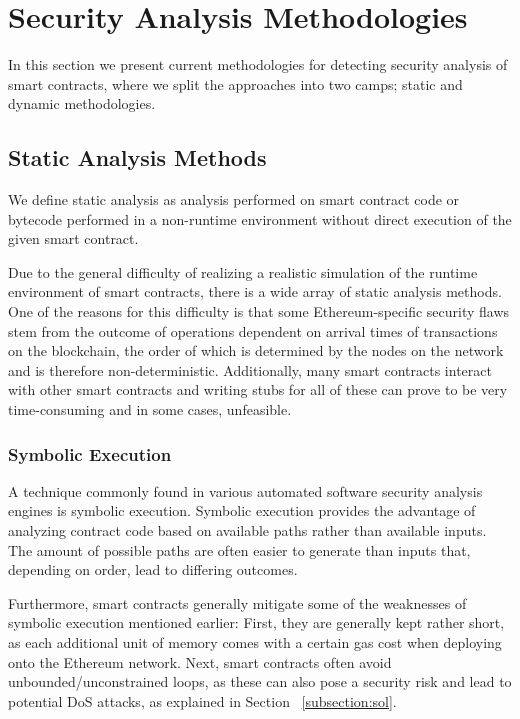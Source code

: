 \documentclass[letterpaper,twocolumn,10pt]{article}
\begin{document}
\section{Security Analysis Methodologies}
In this section we present current methodologies for detecting security analysis of smart contracts, where we split the approaches into two camps; static and dynamic methodologies.


\subsection{Static Analysis Methods}
We define static analysis as analysis performed on smart contract code or bytecode performed in a non-runtime environment without direct execution of the given smart contract.


Due to the general difficulty of realizing a realistic simulation of the runtime environment of smart contracts, there is a wide array of static analysis methods. One of the reasons for this difficulty is that some Ethereum-specific security flaws stem from the outcome of operations dependent on arrival times of transactions on the blockchain, the order of which is determined by the nodes on the network and is therefore non-deterministic. Additionally, many smart contracts interact with other smart contracts and writing stubs for all of these can prove to be very time-consuming and in some cases, unfeasible.


\subsubsection{Symbolic Execution}
A technique commonly found in various automated software security analysis engines is symbolic execution. Symbolic execution provides the advantage of analyzing contract code based on available paths rather than available inputs. The amount of possible paths are often easier to generate than inputs that, depending on order, lead to differing outcomes. 

Furthermore, smart contracts generally mitigate some of the weaknesses of symbolic execution mentioned earlier: First, they are generally kept rather short, as each additional unit of memory comes with a certain gas cost when deploying onto the Ethereum network. Next, smart contracts often avoid unbounded/unconstrained loops, as these can also pose a security risk and lead to potential DoS attacks, as explained in Section ~\ref{subsection:sol}.
\end{document}
